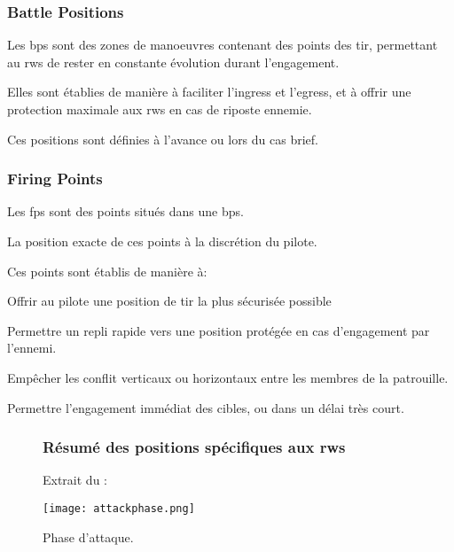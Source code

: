 \subsubsection{Battle Positions}

\e
    \item Les \glspl{bp} sont des zones de manoeuvres contenant des points des tir, permettant au \glspl{rw} de rester en constante évolution durant l’engagement.
    \item Elles sont établies de manière à faciliter l’ingress et l’egress, et à offrir une protection maximale aux \glspl{rw} en cas de riposte ennemie.
    \item Ces positions sont définies à l’avance ou lors du \gls{cas} brief.
\ed

\subsubsection{Firing Points}

\e
    \item Les \glspl{fp} sont des points situés dans une \glspl{bp}.
    \item La position exacte de ces points à la discrétion du pilote.
    \item Ces points sont établis de manière à:
    \ee
        \item Offrir au pilote une position de tir la plus sécurisée possible
        \item Permettre un repli rapide vers une position protégée en cas d'engagement par l'ennemi.
        \item Empêcher les conflit verticaux ou horizontaux entre les membres de la patrouille.
        \item Permettre l'engagement immédiat des cibles, ou dans un délai très court.
    \ed
\ed

\begin{figure}[H]
    \begin{minipage}{\textwidth}
        \subsubsection{Résumé des positions spécifiques aux \gls{rw}s}
        \e
            \item Extrait du \jp:\\
        \ed
    \end{minipage}
    \texttt{[image: attackphase.png]}
    \caption{Phase d'attaque.}
    \label{fig:attackphase}
\end{figure}

